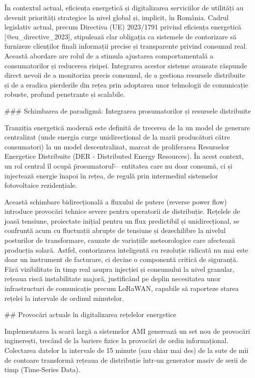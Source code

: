 În contextul actual, eficiența energetică și digitalizarea serviciilor
de utilități au devenit priorități strategice la nivel global și,
implicit, în România. Cadrul legislativ actual, precum Directiva (UE)
2023/1791 privind eficiența energetică [@eu_directive_2023], stipulează
clar obligația ca sistemele de contorizare să furnizeze clienților
finali informații precise și transparente privind consumul real. Această
abordare are rolul de a stimula ajustarea comportamentală a
consumatorilor și reducerea risipei. Integrarea acestor sisteme avansate
răspunde direct nevoii de a monitoriza precis consumul, de a gestiona
resursele distribuite și de a eradica pierderile din rețea prin
adoptarea unor tehnologii de comunicație robuste, profund penetrante și
scalabile.

### Schimbarea de paradigmă: Integrarea prosumatorilor și resursele distribuite

Tranziția energetică modernă este definită de trecerea de la un model de
generare centralizat (unde energia curge unidirecțional de la marii
producători către consumatori) la un model descentralizat, marcat de
proliferarea Resurselor Energetice Distribuite (DER - Distributed Energy
Resources). În acest context, un rol central îl ocupă \"prosumatorul\"
--- entitatea care nu doar consumă, ci și injectează energie înapoi în
rețea, de regulă prin intermediul sistemelor fotovoltaice rezidențiale.

Această schimbare bidirecțională a fluxului de putere (reverse power
flow) introduce provocări tehnice severe pentru operatorii de
distribuție. Rețelele de joasă tensiune, proiectate inițial pentru un
flux predictibil și unidirecțional, se confruntă acum cu fluctuații
abrupte de tensiune și dezechilibre la nivelul posturilor de
transformare, cauzate de variațiile meteorologice care afectează
producția solară. Astfel, contorizarea inteligentă cu rezoluție ridicată
nu mai este doar un instrument de facturare, ci devine o componentă
critică de siguranță. Fără vizibilitate în timp real asupra injecției și
consumului la nivel granular, rețeaua riscă instabilitate majoră,
justificând pe deplin necesitatea unor infrastructuri de comunicație
precum LoRaWAN, capabile să raporteze starea rețelei la intervale de
ordinul minutelor.

## Provocări actuale în digitalizarea rețelelor energetice

Implementarea la scară largă a sistemelor AMI generează un set nou de
provocări inginerești, trecând de la bariere fizice la provocări de
ordin informațional. Colectarea datelor la intervale de 15 minute (sau
chiar mai des) de la sute de mii de contoare transformă rețeaua de
distribuție într-un generator masiv de serii de timp (Time-Series Data).

